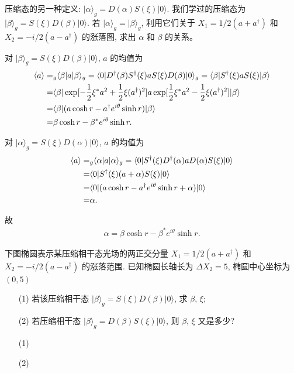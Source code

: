 \documentclass{assignment}
\begin{document}
\begin{prob}
    压缩态的另一种定义: $\lvert\alpha\rangle_g=D(\alpha)S(\xi)\lvert 0\rangle$. 我们学过的压缩态为 $\lvert\beta\rangle_g=S(\xi)D(\beta)\lvert 0\rangle$. 若 $\lvert\alpha\rangle_g=\lvert\beta\rangle_g$, 利用它们关于 $X_1=1/2(a+a^{\dagger})$ 和 $X_2=-i/2(a-a^{\dagger})$ 的涨落图, 求出 $\alpha$ 和 $\beta$ 的关系。
\end{prob}
\begin{sol}
    对 $\lvert\beta\rangle_g=S(\xi)D(\beta)\lvert 0\rangle$, $a$ 的均值为
    \begin{align}
        \notag\langle a\rangle=&_g\langle\beta\rvert a\lvert\beta\rangle_g=\langle 0\rvert D^{\dagger}(\beta)S^{\dagger}(\xi)aS(\xi)D(\beta)\lvert 0\rangle_g=\langle\beta\rvert S^{\dagger}(\xi)aS(\xi)\lvert\beta\rangle\\
        \notag=&\langle\beta\rvert\exp[-\frac{1}{2}\xi^*a^2+\frac{1}{2}\xi(a^{\dagger})^2]a\exp[\frac{1}{2}\xi^*a^2-\frac{1}{2}\xi(a^{\dagger})^2]\lvert\beta\rangle\\
        \notag=&\langle\beta\rvert(a\cosh r-a^{\dagger}e^{i\theta}\sinh r)\lvert\beta\rangle\\
        =&\beta\cosh r-\beta^*e^{i\theta}\sinh r.
    \end{align}

    对 $\lvert\alpha\rangle_g=S(\xi)D(\alpha)\lvert 0\rangle$, $a$ 的均值为
    \begin{align}
        \notag\langle a\rangle=&_g\langle\alpha\rvert a\lvert\alpha\rangle_g=\langle 0\rvert S^{\dagger}(\xi)D^{\dagger}(\alpha)aD(\alpha)S(\xi)\lvert 0\rangle\\
        \notag=&\langle 0\rvert S^{\dagger}(\xi)(a+\alpha)S(\xi)\lvert 0\rangle\\
        \notag=&\langle 0\rvert(a\cosh r-a^{\dagger}e^{i\theta}\sinh r+\alpha)\lvert 0\rangle\\
        =&\alpha.
    \end{align}

    故
    \begin{align}
        \alpha=\beta\cosh r-\beta^*e^{i\theta}\sinh r.
    \end{align}
\end{sol}

\begin{prob}
    下图椭圆表示某压缩相干态光场的两正交分量 $X_1=1/2(a+a^{\dagger})$ 和 $X_2=-i/2(a-a^{\dagger})$ 的涨落范围. 已知椭圆长轴长为 $\Delta X_2=5$, 椭圆中心坐标为 $(0,5)$
    \begin{itemize}
        \item[(1)] 若该压缩相干态 $\lvert\beta\rangle_g=S(\xi)D(\beta)\lvert 0\rangle$, 求 $\beta$, $\xi$;
        \item[(2)] 若压缩相干态 $\lvert\beta\rangle_g=D(\beta)S(\xi)\lvert 0\rangle$, 则 $\beta$, $\xi$ 又是多少?
    \end{itemize}
\end{prob}
\begin{sol}
    \begin{itemize}
        \item[(1)] 
        \item[(2)] 
    \end{itemize}
\end{sol}
\end{document}

